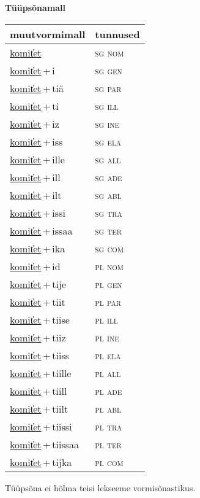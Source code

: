 
\vspace{1.8em}
\begin{minipage}{\textwidth}
\textbf{Tüüpsõnamall \,}\\

\begin{sideways}
\begin{tabular}{l l}
muutvormimall & tunnused \\
\hline
\underline{komit̕et} & \textsc{ sg nom } \\
\underline{komit̕et}\,+\,i & \textsc{ sg gen } \\
\underline{komit̕et}\,+\,tiä & \textsc{ sg par } \\
\underline{komit̕et}\,+\,ti & \textsc{ sg ill } \\
\underline{komit̕et}\,+\,iz & \textsc{ sg ine } \\
\underline{komit̕et}\,+\,iss & \textsc{ sg ela } \\
\underline{komit̕et}\,+\,ille & \textsc{ sg all } \\
\underline{komit̕et}\,+\,ill & \textsc{ sg ade } \\
\underline{komit̕et}\,+\,ilt & \textsc{ sg abl } \\
\underline{komit̕et}\,+\,issi & \textsc{ sg tra } \\
\underline{komit̕et}\,+\,issaa & \textsc{ sg ter } \\
\underline{komit̕et}\,+\,ika & \textsc{ sg com } \\
\underline{komit̕et}\,+\,id & \textsc{ pl nom } \\
\underline{komit̕et}\,+\,tije & \textsc{ pl gen } \\
\underline{komit̕et}\,+\,tiit & \textsc{ pl par } \\
\underline{komit̕et}\,+\,tiise & \textsc{ pl ill } \\
\underline{komit̕et}\,+\,tiiz & \textsc{ pl ine } \\
\underline{komit̕et}\,+\,tiiss & \textsc{ pl ela } \\
\underline{komit̕et}\,+\,tiille & \textsc{ pl all } \\
\underline{komit̕et}\,+\,tiill & \textsc{ pl ade } \\
\underline{komit̕et}\,+\,tiilt & \textsc{ pl abl } \\
\underline{komit̕et}\,+\,tiissi & \textsc{ pl tra } \\
\underline{komit̕et}\,+\,tiissaa & \textsc{ pl ter } \\
\underline{komit̕et}\,+\,tijka & \textsc{ pl com } \\
\end{tabular}
\end{sideways}
\label{tab:tüüpsõnamall-komit̕et}

\end{minipage}

 
\vspace{1em}
\noindent Tüüpsõna ei hõlma teisi lekseeme vormi\-sõnastikus.
